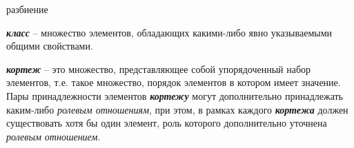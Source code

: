 


	

\begin{scnrelfromset}{разбиение}
\end{scnrelfromset}


\textbf{\textit{класс}} – множество элементов, обладающих какими-либо явно указываемыми общими свойствами.




\textbf{\textit{кортеж}} – это множество, представляющее собой упорядоченный набор элементов, т.е. такое множество, порядок элементов в котором имеет значение. Пары принадлежности элементов \textbf{\textit{кортежу}} могут дополнительно принадлежать каким-либо \textit{ролевым отношениям}, при этом, в рамках каждого \textbf{\textit{кортежа}} должен существовать хотя бы один элемент, роль которого дополнительно уточнена \textit{ролевым отношением}.


